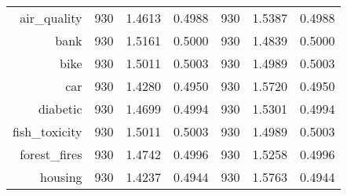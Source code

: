 \begin{table}[htbp]
{\begin{tabular}{rcccccc}
			air\_quality                       & 930                                & \cellcolor[rgb]{ .776,  .937,  .808}\textcolor[rgb]{ 0,  .38,  0}{1.4613}          & 0.4988          & 930                               & 1.5387                                                                    & 0.4988          \\
			bank                               & 930                                & 1.5161                                                                             & 0.5000          & 930                               & \cellcolor[rgb]{ .776,  .937,  .808}\textcolor[rgb]{ 0,  .38,  0}{1.4839} & 0.5000          \\
			bike                               & 930                                & 1.5011                                                                             & 0.5003          & 930                               & \cellcolor[rgb]{ .776,  .937,  .808}\textcolor[rgb]{ 0,  .38,  0}{1.4989} & 0.5003          \\
			car                                & 930                                & \cellcolor[rgb]{ .776,  .937,  .808}\textcolor[rgb]{ 0,  .38,  0}{1.4280}          & 0.4950          & 930                               & 1.5720                                                                    & 0.4950          \\
			diabetic                           & 930                                & \cellcolor[rgb]{ .776,  .937,  .808}\textcolor[rgb]{ 0,  .38,  0}{1.4699}          & 0.4994          & 930                               & 1.5301                                                                    & 0.4994          \\
			fish\_toxicity                     & 930                                & 1.5011                                                                             & 0.5003          & 930                               & \cellcolor[rgb]{ .776,  .937,  .808}\textcolor[rgb]{ 0,  .38,  0}{1.4989} & 0.5003          \\
			forest\_fires                      & 930                                & \cellcolor[rgb]{ .776,  .937,  .808}\textcolor[rgb]{ 0,  .38,  0}{1.4742}          & 0.4996          & 930                               & 1.5258                                                                    & 0.4996          \\
			housing                            & 930                                & \cellcolor[rgb]{ .776,  .937,  .808}\textcolor[rgb]{ 0,  .38,  0}{1.4237}          & 0.4944          & 930                               & 1.5763                                                                    & 0.4944          \\

\end{tabular}}
\end{table}
